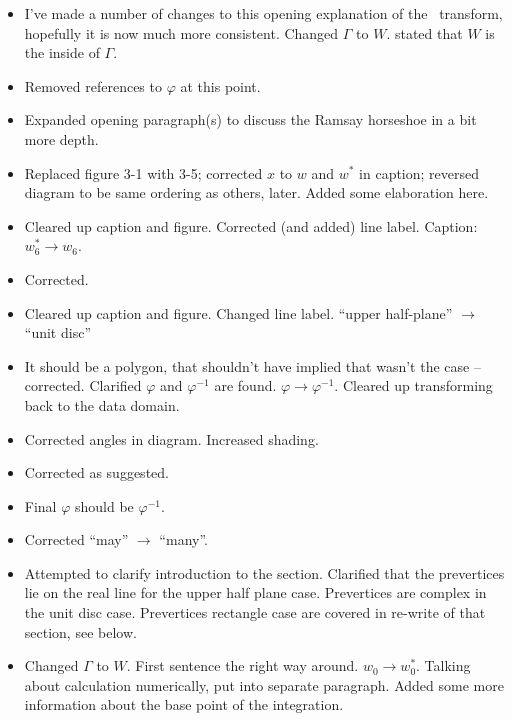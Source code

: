 \begin{itemize}
\item I've made a number of changes to this opening explanation of the \sch\ transform, hopefully it is now much more consistent.  Changed $\Gamma$ to $W$.  stated that $W$ is the inside of $\Gamma$.
\item {} Removed references to $\varphi$ at this point.
\item {} Expanded opening paragraph(s) to discuss the Ramsay horseshoe in a bit more depth.
\item {} Replaced figure 3-1 with 3-5; corrected $x$ to $w$ and $w^*$ in caption; reversed diagram to be same ordering as others, later.  Added some elaboration here.
\item {} Cleared up caption and figure. Corrected (and added) line label. Caption: $w_6^* \rightarrow w_6$. 
\item {} Corrected.
\item {} Cleared up caption and figure. Changed line label. ``upper half-plane'' $\rightarrow$ ``unit disc''
\item {} It should be a polygon, that shouldn't have implied that wasn't the case -- corrected.  Clarified $\varphi$ and $\varphi^{-1}$ are found.  $\varphi \rightarrow \varphi^{-1}$.  Cleared up transforming back to the data domain.
\item {} Corrected angles in diagram. Increased shading.
\item {} Corrected as suggested.
\item {} Final $\varphi$ should be $\varphi^{-1}$.
\item {} Corrected ``may'' $\rightarrow $ ``many''.
\item {} Attempted to clarify introduction to the section.  Clarified that the prevertices lie on the real line for the upper half plane case.  Prevertices are complex in the unit disc case.  Prevertices rectangle case are covered in re-write of that section, see below. 
\item {} Changed $\Gamma$ to $W$.  First sentence the right way around.  $w_0 \rightarrow w^*_0$.   Talking about calculation numerically, put into separate paragraph. Added some more information about the base point of the integration.

\end{itemize}
